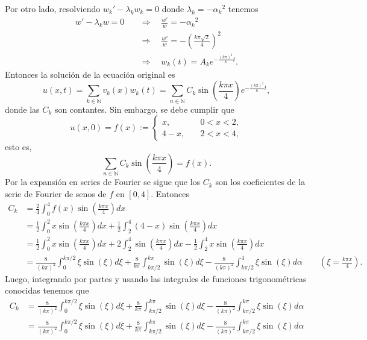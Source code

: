 \documentclass[12pt]{article}
\newcommand{\N}{\mathbb{N}}
\newcommand{\pp}[1]{\left( #1 \right)}
\newcommand{\Imp}{\quad\Longrightarrow\quad}
\renewcommand{\l}{\lambda}
\renewcommand{\a}{\alpha}
\begin{document}
\begin{enumerate}
\begin{enumerate}
            Por otro lado, resolviendo ${w_k}'-\l_k w_k=0$ donde $\l_k=-{\a_k}^2$ tenemos
            \begin{align*}
                w'-\l_k w=0 &\Imp \frac{w'}{w}=-{\a_k}^2\\
                &\Imp \frac{w'}{w}=-\pp{\frac{k\pi\sqrt{2}}{4}}^2\\
                &\Imp w_k(t)= A_ke^{-\frac{(k\pi)^2}{8}t}.
            \end{align*}
            Entonces la solución de la ecuación original es
            \[ u(x,t) = \sum_{k\in\N}v_k(x)w_k(t)=\sum_{n\in\N}C_k\sin\pp{\frac{k\pi x}{4}}e^{-\frac{(k\pi)^2}{8}t}, \]
            donde las $C_k$ son contantes. Sin embargo, se debe cumplir que
            \[u(x,0) = f(x):=\begin{cases}
                x,\quad   &0<x<2,\\
                4-x,\quad &2<x<4,
            \end{cases} \]
            esto es,
            \[
            \sum_{n\in\N}C_k\sin\pp{\frac{k\pi x}{4}}= f(x). \]
            Por la expansión en series de Fourier se sigue que los $C_k$ son los coeficientes de la serie de Fourier de senos de $f$ en $[0,4]$. Entonces
            \begin{align*}
                C_k &= \frac{2}{4}\int_0^4 f(x)\sin\pp{\frac{k\pi x}{4}}dx\\
                &= \frac{1}{2}\int_0^2 x\sin\pp{\frac{k\pi x}{4}}dx+\frac{1}{2}\int_2^4 (4-x)\sin\pp{\frac{k\pi x}{4}}dx\\
                &= \frac{1}{2}\int_0^2 x\sin\pp{\frac{k\pi x}{4}}dx+2\int_2^4\sin\pp{\frac{k\pi x}{4}}dx-\frac{1}{2}\int_2^4x\sin\pp{\frac{k\pi x}{4}}dx\\
                &= \frac{8}{(k\pi)^2}\int_0^{k\pi/2} \xi\sin(\xi)d\xi+\frac{8}{k\pi}\int_{k\pi/2}^{k\pi}\sin(\xi)d\xi-\frac{8}{(k\pi)^2}\int_{k\pi/2}^4\xi\sin(\xi)d\a\qquad (\xi=\tfrac{k\pi x}{4}).
            \end{align*}
            Luego, integrando por partes y usando las integrales de funciones trigonométricas conocidas tenemos que
            \begin{align*}
                C_k &= \frac{8}{(k\pi)^2}\int_0^{k\pi/2} \xi\sin(\xi)d\xi+\frac{8}{k\pi}\int_{k\pi/2}^{k\pi}\sin(\xi)d\xi-\frac{8}{(k\pi)^2}\int_{k\pi/2}^{k\pi}\xi\sin(\xi)d\a\\
                &= \frac{8}{(k\pi)^2}\int_0^{k\pi/2} \xi\sin(\xi)d\xi+\frac{8}{k\pi}\int_{k\pi/2}^{k\pi}\sin(\xi)d\xi-\frac{8}{(k\pi)^2}\int_{k\pi/2}^{k\pi}\xi\sin(\xi)d\a\\

\end{align*}
\end{enumerate}
\end{enumerate}
\end{document}
